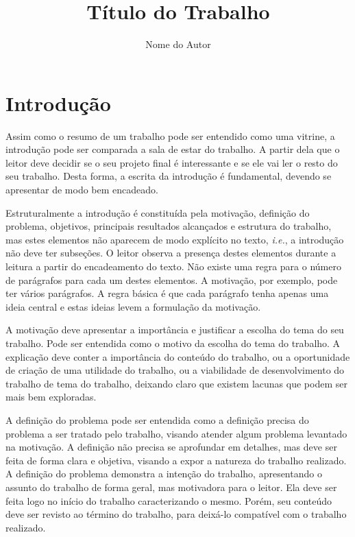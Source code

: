 \documentclass[12pt]{article}
\title{Título do Trabalho}
\author{Nome do Autor\inst{1}}
\begin{document}
 
	
	\maketitle
	
	\begin{resumo} 
		
	\end{resumo}
	
	\section{Introdução}
	\label{sec:introducao}
	
	Assim como o resumo de um trabalho pode ser entendido como uma vitrine, a introdução pode ser comparada a sala de estar do trabalho. A partir dela que o leitor deve decidir se o seu projeto final é interessante e se ele vai ler o resto do seu trabalho. Desta forma, a escrita da introdução é fundamental, devendo se apresentar de modo bem encadeado.

	Estruturalmente a introdução é constituída pela motivação, definição do problema, objetivos, principais resultados alcançados e estrutura do trabalho, mas estes elementos não aparecem de modo explícito no texto, \textit{i.e.}, a introdução não deve ter subseções. O leitor observa a presença destes elementos durante a leitura a partir do encadeamento do texto. Não existe uma regra para o número de parágrafos para cada um destes elementos. A motivação, por exemplo, pode ter vários parágrafos. A regra básica é que cada parágrafo tenha apenas uma ideia central e estas ideias levem a formulação da motivação. 
	
	A motivação deve apresentar a importância e justificar a escolha do tema do seu trabalho. Pode ser entendida como o motivo da escolha do tema do trabalho. A explicação deve conter a importância do conteúdo do trabalho, ou a oportunidade de criação de uma utilidade do trabalho, ou a viabilidade de desenvolvimento do trabalho de tema do trabalho, deixando claro que existem lacunas que podem ser mais bem exploradas. 
	
	A definição do problema pode ser entendida como a definição precisa do problema a ser tratado pelo trabalho, visando atender algum problema levantado na motivação. A definição não precisa se aprofundar em detalhes, mas deve ser feita de forma clara e objetiva, visando a expor a natureza do trabalho realizado. A definição do problema demonstra a intenção do trabalho, apresentando o assunto do trabalho de forma geral, mas motivadora para o leitor. Ela deve ser feita logo no início do trabalho caracterizando o mesmo. Porém, seu conteúdo deve ser revisto ao término do trabalho, para deixá-lo compatível com o trabalho realizado.
	
\end{document}
